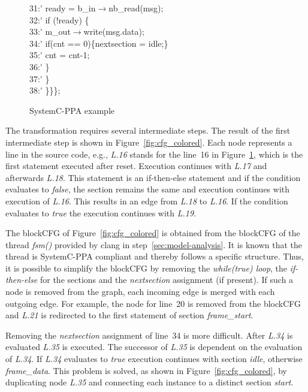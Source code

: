 \begin{figure}
\begin{minipage}{0.9\linewidth}
\begin{tabbing}
31:\'\>\>\>\> ready = b\_in$\rightarrow$nb\_read(msg);\\
32:\'\>\>\>\> if (!ready) \{ \\
33:\'\>\>\>\>\> m\_out$\rightarrow$write(msg.data);\\
34:\'\>\>\>\>\> if(cnt == 0)\{nextsection = idle;\}\\
35:\'\>\>\>\>\> cnt = cnt-1;\\
36:\'\>\>\>\> \}\\
37:\'\>\>\> \}\\
38:\'\>\> \}\}\};\\
    \end{tabbing}
  \end{minipage}
  
  \caption{SystemC-PPA example}
  \label{fig:system-c-example-complex}
\end{figure}



The transformation requires several intermediate steps.
The result of the first intermediate step is shown in Figure~\ref{fig:cfg_colored}.
Each node represents a line in the source code, e.g., \textit{L.16} stands for the line~16 in Figure~\ref{fig:system-c-example-complex}, which is the first statement executed after reset. 
Execution continues with \textit{L.17} and afterwards \textit{L.18}.
This statement is an if-then-else statement and if the condition evaluates to \textit{false}, the section remains the same and execution continues with execution of \textit{L.16}. 
This results in an edge from \textit{L.18} to \textit{L.16}. 
If the condition evaluates to \textit{true} the execution continues with \textit{L.19}.

The blockCFG of Figure~\ref{fig:cfg_colored} is obtained from the blockCFG of the thread \textit{fsm()} provided by clang in step~\ref{sec:model-analysis}.
It is known that the thread is SystemC-PPA compliant and thereby follows a specific structure.
Thus, it is possible to simplify the blockCFG by removing the \emph{while(true) loop}, the \emph{if-then-else} for the sections and the \emph{nextsection} assignment (if present).
If such a node is removed from the graph, each incoming edge is merged with each outgoing edge. 
For example, the node for line~20 is removed from the blockCFG and \textit{L.21} is redirected to the first statement of section \textit{frame\_start}.

Removing the \textit{nextsection} assignment of line~34 is more difficult. 
After \textit{L.34} is evaluated \textit{L.35} is executed. 
The successor of \textit{L.35} is dependent on the evaluation of \textit{L.34}. 
If \textit{L.34} evaluates to \textit{true} execution continues with section \textit{idle}, otherwise \textit{frame\_data}. 
This problem is solved, as shown in Figure~\ref{fig:cfg_colored}, by duplicating node \textit{L.35} and connecting each instance to a distinct section \textit{start}. 

